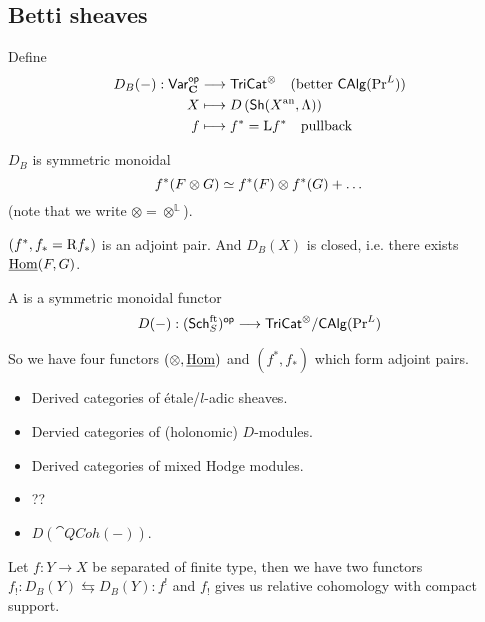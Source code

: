 \subsection{Betti sheaves}
\begin{definition}
	Define
	\begin{align*}
		D_B(-): \mathsf{Var}_{\mathbf{C}}^\mathsf{op} &\longrightarrow \mathsf{TriCat}^{\otimes}\quad (\text{better }\mathsf{CAlg}(\operatorname{Pr}^L)) \\
		X &\longmapsto D\left( \mathsf{Sh}(X^\text{an},\Lambda) \right) \\
		f &\longmapsto f^{*} = \mathrm{L} f^{*}\quad \text{pullback}
	\end{align*}
\end{definition}
$D_B$ is symmetric monoidal
\[
f^{*}(F\otimes G) \simeq f^{*}(F)\otimes f^{*}(G) + \dots
\] 
(note that we write $\otimes = \otimes^{\mathbb{L}}$).
\begin{proposition}
	$(f^{*},f_*=\mathrm{R} f_*)$ is an adjoint pair. And $D_B(X)$ is closed, i.e. there exists $\underline{\operatorname{Hom}}(F,G)$.
\end{proposition}
\begin{definition}
	A  is a symmetric monoidal functor
	\[
		D(-):(\Sch_S^{\text{ft}})\op \to \cat{TriCat}^{\otimes} / \cat{CAlg}(\PrL)
	\] 
\end{definition}
So we have four functors $(\otimes,\underline{\operatorname{Hom}})$ and $(f^{*},f_*)$ which form adjoint pairs.
\begin{example}\leavevmode
	\begin{itemize}
		\item Derived categories of \'etale/$l$-adic sheaves.
		\item Dervied categories of (holonomic) $D$-modules.
		\item Derived categories of mixed Hodge modules.
		\item ??
		\item $D(\cat{QCoh}(-))$.
	\end{itemize}
\end{example}
Let $f:Y\to X$ be separated of finite type, then we have two functors $f_!:D_B(Y)\leftrightarrows D_B(Y):f^{!}$ and $f_!$ gives us relative cohomology with compact support.

